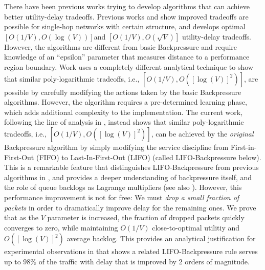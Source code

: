 \documentclass[journal]{IEEEtran}
\begin{document}
There have been previous works trying to develop algorithms that can achieve better utility-delay tradeoffs. 
Previous works \cite{neelysuperfast} and \cite{neelyenergydelay} show improved tradeoffs are possible
for single-hop networks with certain structure, and develops
optimal $[O(1/V), O(\log(V))]$and $[O(1/V), O(\sqrt{V})]$ utility-delay tradeoffs.  
However, the algorithms are different from basic Backpressure and require knowledge of an ``epsilon'' parameter that measures distance to a performance
region boundary. 
Work  \cite{huangneely_dr_tac} uses a completely different
analytical technique to show that similar poly-logarithmic tradeoffs, i.e., $[O(1/V), O([\log(V)]^2)]$, are possible by carefully modifying the actions taken by the basic Backpressure algorithms. 
However, the algorithm requires a pre-determined learning phase, which adds additional complexity to the implementation. 
The current work, following the line of analysis in \cite{huangneely_dr_tac}, instead shows  that similar poly-logarithmic tradeoffs, i.e., $[O(1/V), O([\log(V)]^2)]$, 
can be achieved by the \emph{original} Backpressure algorithm by simply
modifying the service discipline from First-in-First-Out (FIFO) to 
Last-In-First-Out (LIFO) (called LIFO-Backpressure below).   This is a remarkable feature that distinguishes LIFO-Backpressure from previous algorithms in \cite{neelysuperfast}  \cite{neelyenergydelay} \cite{huangneely_dr_tac}, and 
provides a deeper understanding of 
backpressure itself, and the role of queue backlogs as Lagrange multipliers
(see also  \cite{eryilmaz_qbsc_ton07} \cite{huangneely_dr_tac}).  However, this performance improvement 
is not for free: We must  \emph{drop a small fraction of packets} in order to dramatically
improve delay for the remaining ones.  We prove that as the $V$ parameter is
increased, the fraction of dropped packets quickly converges to zero, while
maintaining $O(1/V)$ close-to-optimal utilitiy and $O([\log(V)]^2)$ average backlog. 
This provides an analytical justification for experimental observations 
in \cite{scott_lifo_ipsn} that shows a related LIFO-Backpressure rule serves up to $98\%$ of the traffic with delay that is improved by 2 orders of magnitude. 
\end{document}
